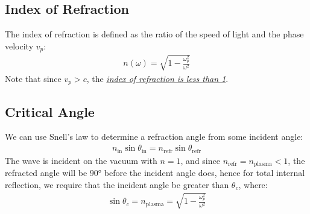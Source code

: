 \subsection{Index of Refraction}
The index of refraction is defined as the ratio of the speed of light and the phase velocity $v_p$:
\begin{align}
  \boxed{n(\omega)=\sqrt{1-\frac{\omega_p^2}{\omega^2}}}
\end{align}
Note that since $v_p>c$, the \underline{\emph{index of refraction is less than 1}}.

\subsection{Critical Angle}
We can use Snell's law to determine a refraction angle from some incident angle:
\begin{align*}
  n_{\text{in}}\sin\theta_{\text{in}}=n_{\text{refr}}\sin\theta_{\text{refr}}
\end{align*}
The wave is incident on the vacuum with $n=1$, and since $n_{\text{refr}}=n_{\text{plasma}}<1$, the refracted angle will be $\ang{90}$ before the incident angle does, hence for total internal reflection, we require that the incident angle be greater than $\theta_c$, where:
\begin{align}
  \boxed{\sin\theta_c=n_{\text{plasma}}=\sqrt{1-\frac{\omega_p^2}{\omega^2}}}
\end{align}

